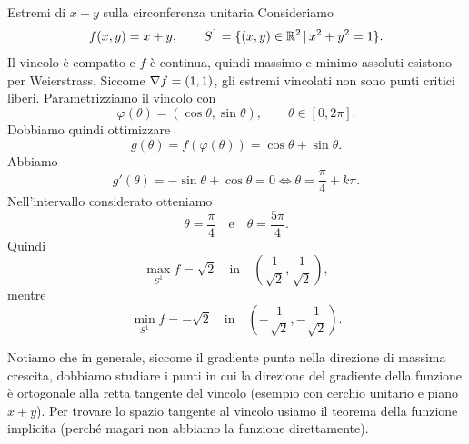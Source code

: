 \documentclass[a4paper]{article}
\begin{document}
\begin{snippetexample}{Estremi di \(x+y\) sulla circonferenza unitaria}
    Consideriamo
    \[
        f(x,y)=x+y,
        \qquad
        S^1=\{(x,y)\in\mathbb{R}^2\,|\, x^2+y^2=1\}.
    \]
    Il vincolo è compatto e \(f\) è continua, quindi massimo e minimo assoluti esistono per Weierstrass.
    Siccome \(\nabla f=(1,1)\), gli estremi vincolati non sono punti critici liberi.
    Parametrizziamo il vincolo con
    \[
        \varphi(\theta)=(\cos\theta,\sin\theta),
        \qquad \theta\in[0,2\pi].
    \]
    Dobbiamo quindi ottimizzare
    \[
        g(\theta)=f(\varphi(\theta))=\cos\theta+\sin\theta.
    \]
    Abbiamo
    \[
        g'(\theta)=-\sin\theta+\cos\theta=0
        \iff
        \theta=\frac\pi4+k\pi.
    \]
    Nell'intervallo considerato otteniamo
    \[
        \theta=\frac\pi4
        \quad\text{e}\quad
        \theta=\frac{5\pi}{4}.
    \]
    Quindi
    \[
        \max_{S^1}f=\sqrt2
        \quad\text{in}\quad
        \left(\frac1{\sqrt2},\frac1{\sqrt2}\right),
    \]
    mentre
    \[
        \min_{S^1}f=-\sqrt2
        \quad\text{in}\quad
        \left(-\frac1{\sqrt2},-\frac1{\sqrt2}\right).
    \]
\end{snippetexample}

Notiamo che in generale, siccome il gradiente punta nella direzione di massima crescita, dobbiamo
studiare i punti in cui la direzione del gradiente della funzione è ortogonale
alla retta tangente del vincolo (esempio con cerchio unitario e piano \(x+y\)).
Per trovare lo spazio tangente al vincolo usiamo il teorema della funzione implicita
(perché magari non abbiamo la funzione direttamente).
\end{document}
